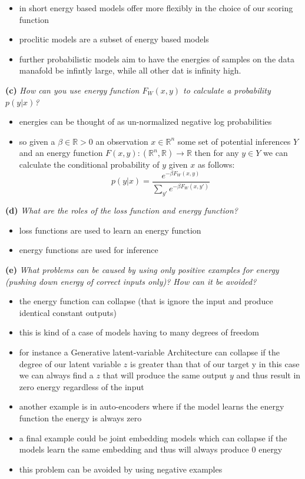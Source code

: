 \documentclass{article}
\begin{document}
\begin{itemize}
    \color{red}
    \item in short energy based models offer more flexibly in the choice of our scoring function  
    \item proclitic models are a subset of energy based models
    \item further probabilistic models aim to have the energies of samples on the data manafold be infintly large, while all other dat is infinity high.
\end{itemize}
\textbf{(c)}
\textit{How can you use energy function $F_W(x, y)$ to calculate a probability $p(y|x)$?}
\begin{itemize}
    \color{red}
    \item energies can be thought of as un-normalized negative log probabilities
    \item so given a $\beta \in \mathbb{R}>0$ an observation $x\in \mathbb{R}^{n}$ some set of potential inferences $Y$ and an energy function $F(x,y):(\mathbb{R}^{n}, \mathbb{R})\rightarrow \mathbb{R}$  then for any $y\in Y$ we can calculate the conditional probability of $y$ given $x$ as follows:
     $$p(y|x)=\frac{e^{-\beta F_W(x,y)}}{\sum_{y'}e^{-\beta F_W(x,y')}}$$
\end{itemize}
\textbf{(d)}
\textit{What are the roles of the loss function and energy function?}
\begin{itemize}
    \color{red}
    \item loss functions are used to learn an energy function 
    \item energy functions are used for inference
\end{itemize}
\textbf{(e)}
\textit{What problems can be caused by using only positive examples for energy (pushing down energy of correct inputs only)? How can it be avoided?}
\begin{itemize}
    \color{red}
    \item the energy function can collapse (that is ignore the input and produce identical constant outputs)
    \item this is kind of a case of models having to many degrees of freedom 
    \item for instance a Generative latent-variable Architecture can collapse if the degree of our latent variable $z$ is greater than that of our target y in this case we can always find a $z$ that will produce the same output $y$ and thus result in zero energy regardless of the input
    \item another example is in auto-encoders where if the model learns the energy function the energy is always zero 
    \item a final example could be joint embedding models which can collapse if the models learn the same embedding and thus will always produce 0 energy
    \item this problem can be avoided by using negative examples
\end{itemize}
\end{document}
